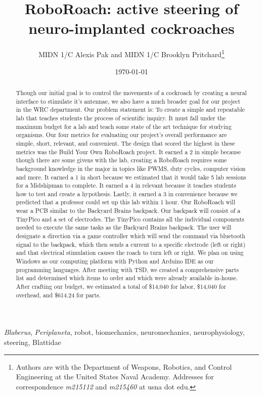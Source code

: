 \documentclass[twocolumn,10pt]{IEEEtran}
\title{RoboRoach: active steering of neuro-implanted cockroaches}
\author{MIDN 1/C Alexis Pak and MIDN 1/C Brooklyn Pritchard\thanks{Authors are with the Department of Weapons, Robotics, and Control Engineering at the United States Naval Academy. Addresses for correspondence \emph{m215112} and \emph{m215460} at usna dot edu.}}
\date{\today}
\newcommand{\Blaberus}{\emph{Blaberus}}
\newcommand{\Periplaneta}{\emph{Periplaneta}}
\begin{document}
\maketitlepage
\maketitle

\begin{abstract}
Though our initial goal is to control the movements of a cockroach by creating a neural interface to stimulate it’s antennae, we also have a much broader goal for our project in the WRC department. Our problem statement is: To create a simple and repeatable lab that teaches students the process of scientific inquiry. It must fall under the maximum budget for a lab and teach some state of the art technique for studying organisms. Our four metrics for evaluating our project’s overall performance are simple, short, relevant, and convenient. The design that scored the highest in these metrics was the Build Your Own RoboRoach project. It earned a 2 in simple because though there are some givens with the lab, creating a RoboRoach requires some background knowledge in the major in topics like PWMS, duty cycles, computer vision and more. It earned a 1 in short because we estimated that it would take 5 lab sessions for a Midshipman to complete. It earned a 4 in relevant because it teaches students how to test and create a hypothesis. Lastly, it earned a 3 in convenience because we predicted that a professor could set up this lab within 1 hour.  Our RoboRoach will wear a PCB similar to the Backyard Brains backpack. Our backpack will consist of a TinyPico and a set of electrodes. The TinyPico contains all the individual components needed to execute the same tasks as the Backyard Brains backpack. The user will designate a direction via a game controller which will send the command via bluetooth signal to the backpack, which then sends a current to a specific electrode (left or right) and that electrical stimulation causes the roach to turn left or right. We plan on using Windows as our computing platform with Python and Arduino IDE as our programming languages. After meeting with TSD, we created a comprehensive parts list and determined which items to order and which were already available in-house. After crafting our budget, we estimated a total of \$14,040 for labor, \$14,040 for overhead, and \$614.24 for parts. 
\end{abstract}

\begin{IEEEkeywords}
\Blaberus, \Periplaneta, robot, biomechanics, neuromechanics, neurophysiology, steering, Blattidae
\end{IEEEkeywords}
\end{document}
